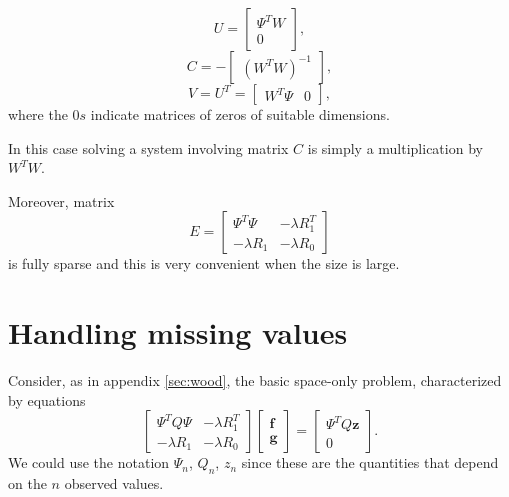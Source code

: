 \begin{equation*}
	U =
	\begin{bmatrix}
		\Psi^TW \\
		0
	\end{bmatrix}
	,
\end{equation*}
\begin{equation*}
	C = -
	\begin{bmatrix}
		\left(W^TW\right)^{-1}
	\end{bmatrix}
	,
\end{equation*}
\begin{equation*}
	V = U^T =
	\begin{bmatrix}
		W^T\Psi & 0
	\end{bmatrix}
	,
\end{equation*} where the $0s$ indicate matrices of zeros of suitable dimensions.

In this case solving a system involving matrix $C$ is simply a multiplication
by $W^T W$.

Moreover, matrix
\begin{equation}
	E=
	\begin{bmatrix}
		\Psi^T\Psi   & -\lambda R_1^T \\
		-\lambda R_1 & -\lambda R_0
	\end{bmatrix}
\end{equation}
is fully sparse and this is very convenient when the size is large.

\section{Handling missing values}
\label{secNA}
Consider, as in appendix \ref{sec:wood}, the basic space-only problem,
characterized by equations
\begin{equation}
	\begin{bmatrix}
		\Psi^TQ\Psi  & -\lambda R_1^T \\
		-\lambda R_1 & -\lambda R_0
	\end{bmatrix}
	\begin{bmatrix}
		\bm{f} \\
		\bm{g}
	\end{bmatrix}
	=
	\begin{bmatrix}{\Psi}^T Q\bm{z} \\
		0
	\end{bmatrix}
	.
\end{equation}
We could use the notation $\Psi_n$, $Q_n$, $z_n$ since these are the
quantities that depend on the $n$ observed values.

